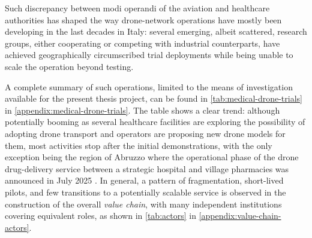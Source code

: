 Such discrepancy between modi operandi of the aviation and healthcare authorities has shaped the way drone-network operations have mostly been developing in the last decades in Italy: several emerging, albeit scattered, research groups, either cooperating or competing with industrial counterparts, have achieved geographically circumscribed trial deployments while being unable to scale the operation beyond testing.

A complete summary of such operations, limited to the means of investigation available for the present thesis project, can be found in \cref{tab:medical-drone-trials} in \cref{appendix:medical-drone-trials}. The table shows a clear trend: although potentially booming as several healthcare facilities are exploring the possibility of adopting drone transport and operators are proposing new drone models for them, most activities stop after the initial demonstrations, with the only exception being the region of Abruzzo where the operational phase of the drone drug-delivery service between a strategic hospital and village pharmacies was announced in July 2025 \cite{asl1_uelcome,abruzzospeciale_uelcome}. In general, a pattern of fragmentation, short-lived pilots, and few transitions to a potentially scalable service is observed in the construction of the overall \textit{value chain}, with many independent institutions covering equivalent roles, as shown in \cref{tab:actors} in \cref{appendix:value-chain-actors}.

 

